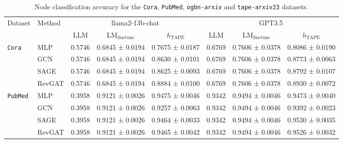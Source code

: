 \documentclass{article}
\begin{document}
\begin{table}[!ht]
    \caption{Node classification accuracy for the \texttt{Cora}, \texttt{PubMed}, \texttt{ogbn-arxiv} and \texttt{tape-arxiv23} datasets. }
\scriptsize
    \label{rebuttal tab: llama2}
    \centering
\begin{tabular}{llcccccc}
\toprule
    \multirow{2}{*}{Dataset}     
    & \multirow{2}{*}{Method}
    & \multicolumn{3}{c}{{llama2-13b-chat}} 
    & \multicolumn{3}{c}{{GPT3.5}}\\
    \cmidrule(lr){3-5}\cmidrule(lr){6-8}
    &  
    & {LLM} & {LM$_{\textrm{finetune}}$} & {$h_\textrm{TAPE}$}
    & LLM & LM$_{\textrm{finetune}}$ & {$h_\textrm{TAPE}$}
    
    \\
    \midrule
         \multirow{3}{*}{\texttt{Cora}} 
         & MLP
         & {0.5746}
         & {0.6845 ± 0.0194}
         & 0.7675 ± 0.0187
         & 0.6769
         & 0.7606 ± 0.0378
         &0.8086 ± 0.0190
         \\
         & GCN 
         & {0.5746}
         & {0.6845 ± 0.0194}
         & 0.8630 ± 0.0101
         & 0.6769
         & 0.7606 ± 0.0378
         & 0.8773 ± 0.0063
         \\
         & SAGE
         & {0.5746}
         & {0.6845 ± 0.0194}
         & 0.8625 ± 0.0093
         & 0.6769
         & 0.7606 ± 0.0378
         & 0.8792 ± 0.0107
         \\
         & RevGAT
         & {0.5746}
         & {0.6845 ± 0.0194}
         & 0.8884 ± 0.0100
         & 0.6769
         & 0.7606 ± 0.0378
         & 0.8930 ± 0.0072
         \\
         \midrule
    \multirow{3}{*}{\texttt{PubMed}} 
        & MLP
        & {0.3958}
         & {0.9121 ± 0.0026}
         & 0.9475 ± 0.0046
         & 0.9342
         & 0.9494 ± 0.0046
         & 0.9473 ± 0.0040
         \\
         & GCN 
         & {0.3958}
         & {0.9121 ± 0.0026}
         & 0.9257 ± 0.0063
         & 0.9342
         & 0.9494 ± 0.0046
         & 0.9392 ± 0.0023
         \\
         & SAGE
         & {0.3958}
         & {0.9121 ± 0.0026}
         & 0.9464 ± 0.0033
         & 0.9342
         & 0.9494 ± 0.0046
         & 0.9530 ± 0.0035
         \\
         & RevGAT
         & {0.3958}
         & {0.9121 ± 0.0026}
         & 0.9465 ± 0.0042
         & 0.9342
         & 0.9494 ± 0.0046
         & 0.9526 ± 0.0032
         \\

\end{tabular}
\end{table}
\end{document}
